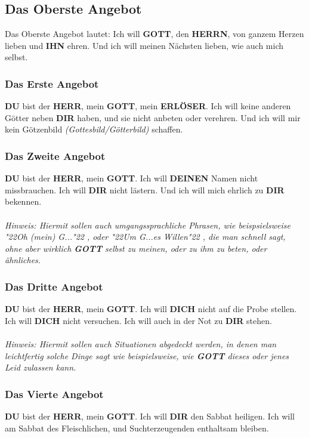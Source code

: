 \documentclass[12pt,a5paper]{article}
\newcommand{\Deinen}[0]{\textbf{DEINEN}}
\newcommand{\Dich}[0]{\textbf{DICH}}
\newcommand{\Dir}[0]{\textbf{DIR}}
\newcommand{\Du}[0]{\textbf{DU}}
\newcommand{\Erloeser}[0]{\textbf{ERL\"OSER}}
\newcommand{\Gott}[0]{\textbf{GOTT}}
\newcommand{\Herrn}[0]{\textbf{HERRN}}
\newcommand{\Herr}[0]{\textbf{HERR}}
\newcommand{\Ihn}[0]{\textbf{IHN}}
\newcommand{\q}[1]{\char"22{#1}\char"22 }
\begin{document}
	\subsection{Das Oberste Angebot}
		Das Oberste Angebot lautet:
		Ich will {\Gott}, den {\Herrn}, von ganzem Herzen lieben und {\Ihn} ehren. Und ich will meinen N\"achsten lieben, wie auch mich selbst.

	\subsubsection{Das Erste Angebot}
		{\Du} bist der {\Herr},
		mein {\Gott},
		mein {\Erloeser}.
		Ich will keine anderen G\"otter neben {\Dir} haben,
		und sie nicht anbeten oder verehren.
		Und ich will mir kein G\"otzenbild
		\textit{(Gottesbild/G\"otterbild)}
		schaffen.
		
	\subsubsection{Das Zweite Angebot}
		{\Du} bist der {\Herr},
		mein {\Gott}.
		Ich will {\Deinen} Namen nicht missbrauchen.
		Ich will {\Dir} nicht l\"astern.
		Und ich will mich ehrlich zu {\Dir} bekennen.
		\\
		\\
		\textit{Hinweis:
		Hiermit sollen auch umgangssprachliche Phrasen,
		wie beispsielsweise \q{Oh (mein) G...},
		oder \q{Um G...es Willen},
		die man schnell sagt,
		ohne aber wirklich {\Gott} selbst zu meinen,
		oder zu ihm zu beten,
		oder \"ahnliches.}
			
	\subsubsection{Das Dritte Angebot}
		{\Du} bist der {\Herr},
		mein {\Gott}.
		Ich will {\Dich} nicht auf die Probe stellen.
		Ich will {\Dich} nicht versuchen.
		Ich will auch in der Not zu {\Dir} stehen.
		\\
		\\
		\textit{Hinweis:
		Hiermit sollen auch Situationen abgedeckt werden,
		in denen man leichtfertig solche Dinge sagt wie beispielsweise,
		wie {\Gott} dieses oder jenes Leid zulassen kann.}
		
	\subsubsection{Das Vierte Angebot}
		{\Du} bist der {\Herr},
		mein {\Gott}.
		Ich will {\Dir} den Sabbat heiligen.
		Ich will am Sabbat des Fleischlichen,
		und Suchterzeugenden enthaltsam bleiben.
		
\end{document}
